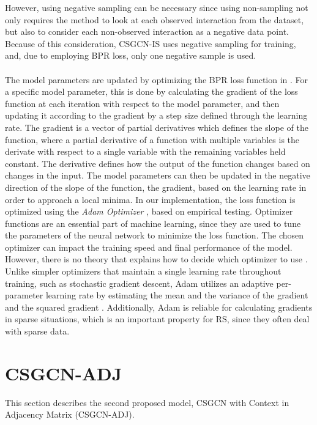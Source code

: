 However, using negative sampling can be necessary since using non-sampling not only requires the method to look at each observed interaction from the dataset, but also to consider each non-observed interaction as a negative data point.
Because of this consideration, CSGCN-IS uses negative sampling for training, and, due to employing BPR loss, only one negative sample is used.
\\\\
The model parameters are updated by optimizing the BPR loss function in .
For a specific model parameter, this is done by calculating the gradient of the loss function at each iteration with respect to the model parameter, and then updating it according to the gradient by a step size defined through the learning rate.
The gradient is a vector of partial derivatives which defines the slope of the function, where a partial derivative of a function with multiple variables is the derivate with respect to a single variable with the remaining variables held constant.
The derivative defines how the output of the function changes based on changes in the input.
The model parameters can then be updated in the negative direction of the slope of the function, the gradient, based on the learning rate in order to approach a local minima. 
In our implementation, the loss function is optimized using the \textit{Adam Optimizer} \cite{AdamOptimizer}, based on empirical testing.
Optimizer functions are an essential part of machine learning, since they are used to tune the parameters of the neural network to minimize the loss function.
The chosen optimizer can impact the training speed and final performance of the model.
However, there is no theory that explains how to decide which optimizer to use \cite{EmpiricalOptimizers}.
Unlike simpler optimizers that maintain a single learning rate throughout training, such as stochastic gradient descent, Adam utilizes an adaptive per-parameter learning rate by estimating the mean and the variance of the gradient and the squared gradient \cite{AdamOptimizer}.
Additionally, Adam is reliable for calculating gradients in sparse situations, which is an important property for RS, since they often deal with sparse data.

\section{CSGCN-ADJ}\label{sec:csgcn_adj}
This section describes the second proposed model, CSGCN with Context in Adjacency Matrix (CSGCN-ADJ).

